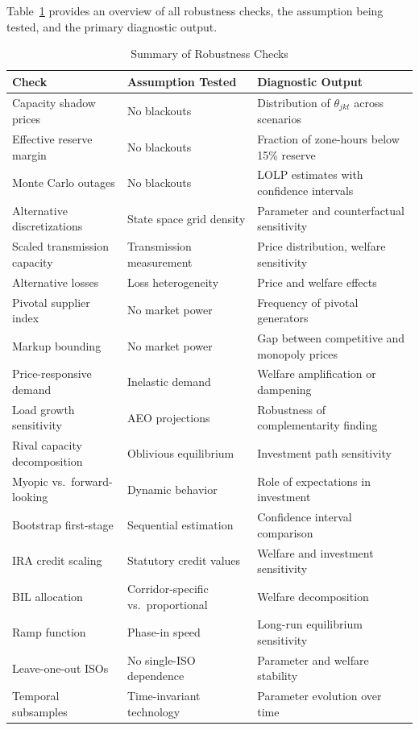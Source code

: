 \documentclass[12pt]{article}
\begin{document}
Table~\ref{tab:robustness_summary} provides an overview of all robustness checks, the assumption being tested, and the primary diagnostic output.

\begin{table}[htbp]
\centering
\caption{Summary of Robustness Checks}
\label{tab:robustness_summary}
\small
\begin{tabular}{p{4.5cm} p{4.5cm} p{4.5cm}}
\hline
\textbf{Check} & \textbf{Assumption Tested} & \textbf{Diagnostic Output} \\
\hline
Capacity shadow prices & No blackouts & Distribution of $\theta_{jkt}$ across scenarios \\
Effective reserve margin & No blackouts & Fraction of zone-hours below 15\% reserve \\
Monte Carlo outages & No blackouts & LOLP estimates with confidence intervals \\
Alternative discretizations & State space grid density & Parameter and counterfactual sensitivity \\
Scaled transmission capacity & Transmission measurement & Price distribution, welfare sensitivity \\
Alternative losses & Loss heterogeneity & Price and welfare effects \\
Pivotal supplier index & No market power & Frequency of pivotal generators \\
Markup bounding & No market power & Gap between competitive and monopoly prices \\
Price-responsive demand & Inelastic demand & Welfare amplification or dampening \\
Load growth sensitivity & AEO projections & Robustness of complementarity finding \\
Rival capacity decomposition & Oblivious equilibrium & Investment path sensitivity \\
Myopic vs.\ forward-looking & Dynamic behavior & Role of expectations in investment \\
Bootstrap first-stage & Sequential estimation & Confidence interval comparison \\
IRA credit scaling & Statutory credit values & Welfare and investment sensitivity \\
BIL allocation & Corridor-specific vs.\ proportional & Welfare decomposition \\
Ramp function & Phase-in speed & Long-run equilibrium sensitivity \\
Leave-one-out ISOs & No single-ISO dependence & Parameter and welfare stability \\
Temporal subsamples & Time-invariant technology & Parameter evolution over time \\
\hline
\end{tabular}
\end{table}
\end{document}

